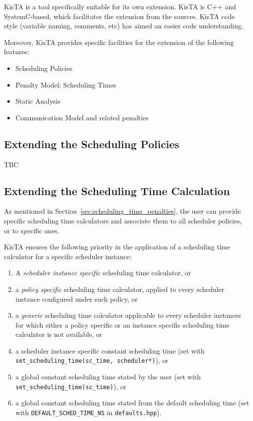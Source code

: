 
KisTA is a tool specifically suitable for its own extension.
KisTA is C++ and SystemC-based, which facilitates the extension from the sources.
KisTA code style (variable naming, comments, etc) has aimed an easier code understanding.

Moreover, KisTA provides specific facilities for the extension of the following features:

\begin{itemize}
\item Scheduling Policies
\item Penalty Model: Scheduling Times
\item Static Analysis
\item Communication Model and related penalties
\end{itemize}

\subsection{Extending the Scheduling Policies}
\label{sec:ext_sched_pol}
TBC

\subsection{Extending the Scheduling Time Calculation}
\label{sec:ext_sched_time}

As mentioned in Section~\ref{sec:scheduling_time_penalties}, the user can provide 
specific scheduling time calculators and associate them to all scheduler policies,
or to specific ones.

KisTA ensures the following priority in the application of a scheduling time calculator
for a specific scheduler instance:
\begin{enumerate}
\item A \emph{scheduler instance specific} scheduling time calculator, or 
\item a \emph{policy specific} scheduling time calculator, applied to every scheduler instance configured under such policy, or 
\item a \emph{generic} scheduling time calculator applicable to every scheduler instances for which either a policy specific or an instance specific scheduling time calculator is not available, or 
\item a scheduler instance specific constant scheduling time (set with \texttt{set\_scheduling\_time(sc\_time, scheduler*)}), or 
\item a global constant scheduling time stated by the user (set with \texttt{set\_scheduling\_time(sc\_time)}), or 
\item a global constant scheduling time stated from the default scheduling time (set with \texttt{DEFAULT\_SCHED\_TIME\_NS} in \texttt{defaults.hpp}).
\end{enumerate}

